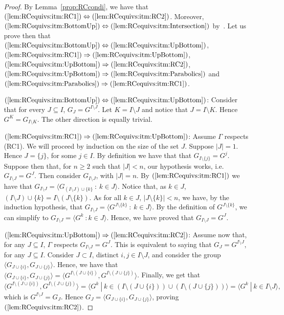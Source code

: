 \documentclass[11pt,letterpaper]{amsart}
\begin{document}
\begin{proof}
    By Lemma~\ref{prop:RCcondi}, we have that $(\ref{lem:RCequivs:itm:RC1})\Leftrightarrow (\ref{lem:RCequivs:itm:RC2})$. Moreover, $(\ref{lem:RCequivs:itm:BottomUp})\Leftrightarrow (\ref{lem:RCequivs:itm:Intersection})$ by~\cite[pp.306]{Pasini1994}.
    Let us prove then that $(\ref{lem:RCequivs:itm:BottomUp})\Leftrightarrow (\ref{lem:RCequivs:itm:UpBottom})$,
    $(\ref{lem:RCequivs:itm:RC1}) \Rightarrow (\ref{lem:RCequivs:itm:UpBottom})$, $(\ref{lem:RCequivs:itm:UpBottom})\Rightarrow (\ref{lem:RCequivs:itm:RC2})$, $(\ref{lem:RCequivs:itm:UpBottom})\Rightarrow (\ref{lem:RCequivs:itm:Parabolics})$ and $(\ref{lem:RCequivs:itm:Parabolics})\Rightarrow (\ref{lem:RCequivs:itm:RC1})$.

    $(\ref{lem:RCequivs:itm:BottomUp})\Leftrightarrow (\ref{lem:RCequivs:itm:UpBottom})$: Consider that for every $J\subseteq I$, $G_{J} = G^{I\setminus J}$. Let $K = I\setminus J$ and notice that $J=I\setminus K$. Hence $G^K = G_{I\setminus K}$. The other direction is equally trivial.

    $(\ref{lem:RCequivs:itm:RC1}) \Rightarrow (\ref{lem:RCequivs:itm:UpBottom})$: 
    Assume $\Gamma$ respects (RC1).
    We will proceed by induction on the size of the set $J$.
    Suppose $|J|=1$. Hence $J=\{j\}$, for some $j\in I$.
    By definition we have that that $G_{I\setminus \{j\}} = G^j$.
    Suppose then that, for $n\geq 2$ such that $|J|<n$, our hypothesis works, i.e. $G_{I\setminus J}= G^J$. Then consider $G_{I\setminus J}$, with $|J|=n$.
    By $(\ref{lem:RCequivs:itm:RC1})$ we have that $G_{I\setminus J} = \langle G_{(I\setminus J) \cup \{k\}} \ : \ k\in J\rangle$. Notice that, as $k\in J$, $(I\setminus J)\cup \{k\} = I\setminus(J\setminus\{k\})$.
    As for all $k\in J$, $|J\setminus\{k\}|<n$, we have, by the induction hypothesis, that 
    $G_{I\setminus J} =\langle G^{J\setminus\{k\}}\ : \ k\in J\rangle$. By the definition of $G^{J\setminus\{k\}}$, we can simplify to  $G_{I\setminus J}= \langle G^k\ : k\in J\rangle$.
    Hence, we have proved that $G_{I\setminus J} = G^J$.

    $(\ref{lem:RCequivs:itm:UpBottom})\Rightarrow (\ref{lem:RCequivs:itm:RC2})$: 
    Assume now that, for any $J\subseteq I$, $\Gamma$ respects $G_{I\setminus J} = G^J$. 
    This is equivalent to saying that $G_{J} = G^{I\setminus J}$, for any $J\subseteq I$.
    Consider $J\subset I$, distinct $i,j\in I\setminus J$, and consider the group $\langle G_{J\cup \{i\}}, G_{J\cup\{j\}}\rangle$.
    Hence, we have that $\langle G_{J\cup \{i\}}, G_{J\cup\{j\}}\rangle = \langle G^{I\setminus(J\cup \{i\})}, G^{I\setminus(J\cup\{j\})}\rangle$.
    Finally, we get that $$\langle G^{I\setminus(J\cup \{i\})}, G^{I\setminus(J\cup\{j\})}\rangle = \langle G^k\ | \ k\in (I\setminus(J\cup \{i\}))\cup (I\setminus(J\cup \{j\}))\rangle = \langle G^k\ | \ k \in I\setminus J\rangle,$$
    which is $G^{I\setminus J} = G_J$.
    Hence $G_J = \langle G_{J\cup \{i\}}, G_{J\cup\{j\}}\rangle$, proving $(\ref{lem:RCequivs:itm:RC2})$.
    

\end{proof}
\end{document}
